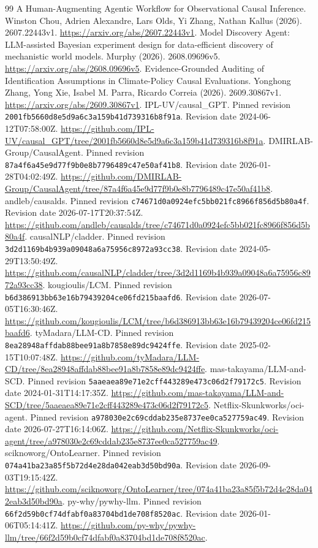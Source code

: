 \begin{thebibliography}{99}
 A Human-Augmenting Agentic Workflow for Observational Causal Inference. Winston Chou, Adrien Alexandre, Lars Olds, Yi Zhang, Nathan Kallus (2026). 2607.22443v1. \url{https://arxiv.org/abs/2607.22443v1}.
 Model Discovery Agent: LLM-assisted Bayesian experiment design for data-efficient discovery of mechanistic world models. Murphy (2026). 2608.09696v5. \url{https://arxiv.org/abs/2608.09696v5}.
 Evidence-Grounded Auditing of Identification Assumptions in Climate-Policy Causal Evaluations. Yonghong Zhang, Yong Xie, Isabel M. Parra, Ricardo Correia (2026). 2609.30867v1. \url{https://arxiv.org/abs/2609.30867v1}.
 IPL-UV/causal\_GPT. Pinned revision \nolinkurl{2001fb5660d8e5d9a6c3a159b41d739316b8f91a}. Revision date 2024-06-12T07:58:00Z. \url{https://github.com/IPL-UV/causal_GPT/tree/2001fb5660d8e5d9a6c3a159b41d739316b8f91a}.
 DMIRLAB-Group/CausalAgent. Pinned revision \nolinkurl{87a4f6a45e9d77f9b0e8b7796489c47e50af41b8}. Revision date 2026-01-28T04:02:49Z. \url{https://github.com/DMIRLAB-Group/CausalAgent/tree/87a4f6a45e9d77f9b0e8b7796489c47e50af41b8}.
 andleb/causalds. Pinned revision \nolinkurl{c74671d0a0924efc5bb021fc8966f856d5b80a4f}. Revision date 2026-07-17T20:37:54Z. \url{https://github.com/andleb/causalds/tree/c74671d0a0924efc5bb021fc8966f856d5b80a4f}.
 causalNLP/cladder. Pinned revision \nolinkurl{3d2d1169b4b939a09048a6a75956c8972a93cc38}. Revision date 2024-05-29T13:50:49Z. \url{https://github.com/causalNLP/cladder/tree/3d2d1169b4b939a09048a6a75956c8972a93cc38}.
 kougioulis/LCM. Pinned revision \nolinkurl{b6d386913bb63e16b79439204ce06fd215baafd6}. Revision date 2026-07-05T16:30:46Z. \url{https://github.com/kougioulis/LCM/tree/b6d386913bb63e16b79439204ce06fd215baafd6}.
 tyMadara/LLM-CD. Pinned revision \nolinkurl{8ea28948affdab88bee91a8b7858e89dc9424ffe}. Revision date 2025-02-15T10:07:48Z. \url{https://github.com/tyMadara/LLM-CD/tree/8ea28948affdab88bee91a8b7858e89dc9424ffe}.
 mas-takayama/LLM-and-SCD. Pinned revision \nolinkurl{5aaeaea89e71e2cff443289e473c06d2f79172c5}. Revision date 2024-01-31T14:17:35Z. \url{https://github.com/mas-takayama/LLM-and-SCD/tree/5aaeaea89e71e2cff443289e473c06d2f79172c5}.
 Netflix-Skunkworks/oci-agent. Pinned revision \nolinkurl{a978030e2c69cddab235e8737ee0ca527759ac49}. Revision date 2026-07-27T16:14:06Z. \url{https://github.com/Netflix-Skunkworks/oci-agent/tree/a978030e2c69cddab235e8737ee0ca527759ac49}.
 sciknoworg/OntoLearner. Pinned revision \nolinkurl{074a41ba23a85f5b72d4e28da042eab3d50bd90a}. Revision date 2026-09-03T19:15:42Z. \url{https://github.com/sciknoworg/OntoLearner/tree/074a41ba23a85f5b72d4e28da042eab3d50bd90a}.
 py-why/pywhy-llm. Pinned revision \nolinkurl{66f2d59b0cf74dfabf0a83704bd1de708f8520ac}. Revision date 2026-01-06T05:14:41Z. \url{https://github.com/py-why/pywhy-llm/tree/66f2d59b0cf74dfabf0a83704bd1de708f8520ac}.
\end{thebibliography}
